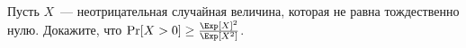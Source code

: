 Пусть $X$~--- неотрицательная случайная величина, которая не равна тождественно нулю. Докажите, что
$\Pr[X > 0] \ge \frac{\Exp[X]^2}{\Exp[X^2]}$.
